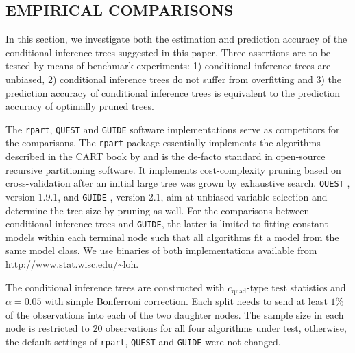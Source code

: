 

\begin{center}
\section{EMPIRICAL COMPARISONS \label{ec}}
\end{center}

In this section, we investigate both the estimation and prediction accuracy of the
conditional inference trees suggested in this paper. Three assertions are to
be tested by means of benchmark experiments: 1) conditional inference trees
are unbiased, 2) conditional inference trees do not suffer from overfitting
and 3) the prediction accuracy of conditional inference trees is equivalent to
the prediction accuracy of optimally pruned trees. 

The \texttt{rpart},
\texttt{QUEST} and \texttt{GUIDE} software implementations serve as
competitors for the comparisons.
The \texttt{rpart} package \citep{an-introdu:1997} essentially implements
the
algorithms described in the CART book by \cite{classifica:1984} and is the
de-facto standard in
open-source recursive partitioning software. It implements
cost-complexity pruning based on cross-validation after an initial large
tree was grown by exhaustive search. \texttt{QUEST} 
\citep[quick, unbiased and efficient statistical tree for nominal
responses,][]{LohShih1997}, version 1.9.1, and \texttt{GUIDE} 
\citep[generalized, unbiased, interaction detection and estimation for 
numeric responses,][]{Loh2002}, version 2.1, 
aim at unbiased variable selection and determine the tree size by pruning as
well. 
For the comparisons between conditional inference trees and \texttt{GUIDE},
the latter is limited to fitting constant models within each
terminal node such that all algorithms fit a model from the same
model class.
We use binaries of both implementations available from
\url{http://www.stat.wisc.edu/~loh}.

The conditional inference trees
are constructed with $c_\text{quad}$-type test statistics and $\alpha =
0.05$ with simple Bonferroni correction.
Each split needs to send at least
$1\%$ of the observations into each of the two daughter nodes.
The sample size in each node is restricted to $20$
observations for all four algorithms under test, otherwise, the default
settings of \texttt{rpart}, \texttt{QUEST} and \texttt{GUIDE} 
were not changed. 

